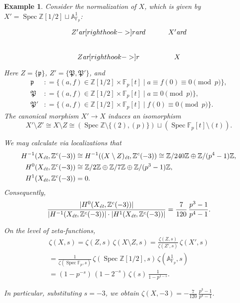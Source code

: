 \documentclass[draft]{article}
\DeclareMathOperator{\Spec}{Spec}
\newcommand{\FF}{\mathbb{F}}
\newcommand{\ZZ}{\mathbb{Z}}
\renewcommand{\AA}{\mathbb{A}}
\newcommand{\ar}{\text{\it ar}}
\newcommand{\et}{\text{\it \'{e}t}}
\newcommand{\dfn}{\mathrel{\mathop:}=}
\theoremstyle{myplain}
\theoremstyle{mydefinition}
\newtheorem{example}[theorem]{Example}
\numberwithin{equation}{section}
\begin{document}
\begin{example}
  Consider the normalization of $X$, which is given by
  $X' = \Spec \ZZ [1/2] \sqcup \AA^1_{\FF_p}$:
  \[ \begin{tikzcd}
      Z' \ar[right hook->]{r}\ar{d} & X' \ar{d} \\
      Z \ar[right hook->]{r} & X
    \end{tikzcd} \]
  Here $Z = \{ \mathfrak{p} \}$, $Z' = \{ \mathfrak{P}, \mathfrak{P}' \}$,
  and
  \begin{align*}
    \mathfrak{p} & \dfn \{ (a,f) \in \ZZ [1/2] \times \FF_p [t] \mid a \equiv f(0) \equiv 0 \pmod{p} \}, \\
    \mathfrak{P} & \dfn \{ (a,f) \in \ZZ [1/2] \times \FF_p [t] \mid a \equiv 0 \pmod{p} \}, \\
    \mathfrak{P}' & \dfn \{ (a,f) \in \ZZ [1/2] \times \FF_p [t] \mid f(0) \equiv 0 \pmod{p} \}.
  \end{align*}
  The canonical morphism $X' \to X$ induces an isomorphism
  \[ X'\setminus Z' \cong X\setminus Z \cong
    (\Spec \ZZ \setminus \{ (2), (p) \}) \sqcup
    (\Spec \FF_p [t] \setminus (t)). \]

  We may calculate via localizations that
  \begin{align*}
    H^{-1} (X_\et, \ZZ^c (-3)) & \cong H^{-1} ((X\setminus Z)_\et, \ZZ^c (-3)) \cong
                                 \ZZ/240\ZZ \oplus \ZZ/(p^4 - 1)\ZZ, \\
    H^0 (X_\et, \ZZ^c (-3)) & \cong \ZZ/2\ZZ \oplus \ZZ/7\ZZ \oplus \ZZ/(p^3 - 1)\ZZ, \\
    H^1 (X_\et, \ZZ^c (-3)) & = 0.
  \end{align*}
  Consequently,
  \[ \frac{|H^0 (X_\et, \ZZ^c (-3))|}{|H^{-1} (X_\et, \ZZ^c (-3))|\cdot |H^1 (X_\et, \ZZ^c (-3))|} =
    \frac{7}{120}\,\frac{p^3-1}{p^4 - 1}. \]

  On the level of zeta-functions,
  \begin{multline*}
    \zeta (X,s) =
    \zeta (Z,s)\,\zeta (X\setminus Z,s) =
    \frac{\zeta (Z,s)}{\zeta (Z',s)}\,\zeta (X',s) \\
    = \frac{1}{\zeta (\Spec \FF_p,s)}\,\zeta (\Spec \ZZ[1/2],s)\,\zeta (\AA^1_{\FF_p},s) \\
    = (1-p^{-s})\,(1 - 2^{-s})\,\zeta (s)\,\frac{1}{1 - p^{1-s}}.
  \end{multline*}

  In particular, substituting $s = -3$, we obtain
  $\zeta (X,-3) = -\frac{7}{120}\,\frac{p^3 - 1}{p^4 - 1}$.
\end{example}


\pagebreak


\end{document}
